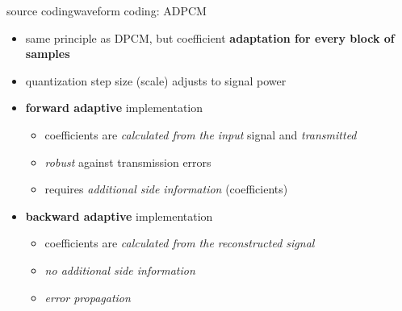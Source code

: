 	\begin{frame}{source coding}{waveform coding: ADPCM}
        \begin{itemize}
            \item   same principle as DPCM, but coefficient \textbf{adaptation for every block of samples}
            \item   quantization step size (scale) adjusts to signal power
            \pause
            \bigskip
            \item   \textbf{forward adaptive} implementation
                \begin{itemize}
                    \item   coefficients are \textit{calculated from the input} signal and \textit{transmitted}
                    \item   \textit{robust} against transmission errors 
                    \item   requires \textit{additional side information} (coefficients)
                \end{itemize}
            \pause
            \item   \textbf{backward adaptive} implementation
                \begin{itemize}
                    \item   coefficients are \textit{calculated from the reconstructed signal} 
                    \item   \textit{no additional side information}
                    \item   \textit{error propagation}
                \end{itemize}
        \end{itemize}
	\end{frame}
